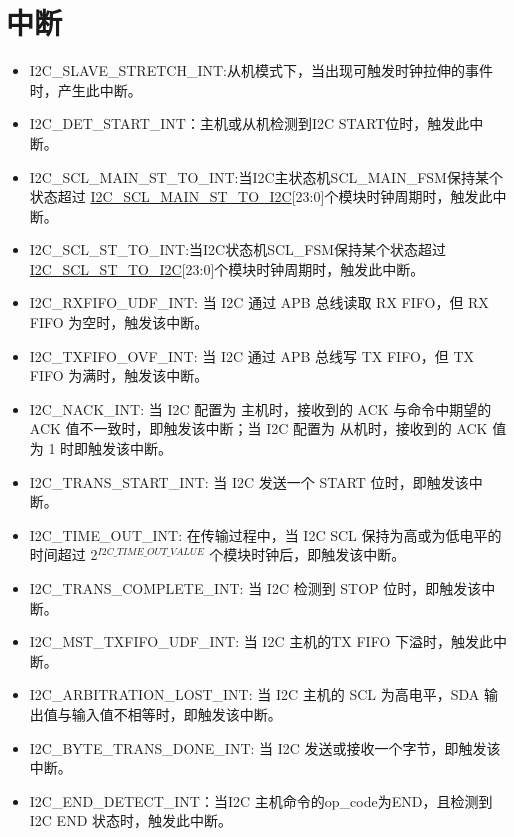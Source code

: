 \documentclass[main\_\_CN.tex]{subfiles}
\begin{document}
\section{中断}\label{sub:i2c-int}
\begin{itemize}
\item \label{int:i2c-slave-stretch}I2C\_SLAVE\_STRETCH\_INT:从机模式下，当出现可触发时钟拉伸的事件时，产生此中断。
\item \label{int:i2c-start}I2C\_DET\_START\_INT：主机或从机检测到I2C START位时，触发此中断。
\item \label{int:i2c-scl-main-fsm}I2C\_SCL\_MAIN\_ST\_TO\_INT:当I2C主状态机SCL\_MAIN\_FSM保持某个状态超过 \hyperref[fielddesc:I2CSCLMAINSTTOI2C]{I2C\_SCL\_MAIN\_ST\_TO\_I2C}[23:0]个模块时钟周期时，触发此中断。      
\item \label{int:i2c-scl-fsm}I2C\_SCL\_ST\_TO\_INT:当I2C状态机SCL\_FSM保持某个状态超过 \hyperref[fielddesc:I2CSCLSTTOI2C]{I2C\_SCL\_ST\_TO\_I2C}[23:0]个模块时钟周期时，触发此中断。
\item \label{int:i2c-rxfifo-udf}I2C\_RXFIFO\_UDF\_INT: 当 I2C 通过 APB 总线读取 RX FIFO，但 RX FIFO 为空时，触发该中断。
\item \label{int:i2c-txfifo-ovf}I2C\_TXFIFO\_OVF\_INT: 当 I2C 通过 APB 总线写 TX FIFO，但 TX FIFO 为满时，触发该中断。
\item \label{int:i2c-nack}I2C\_NACK\_INT: 当 I2C 配置为 主机时，接收到的 ACK 与命令中期望的 ACK 值不一致时，即触发该中断；当 I2C 配置为 从机时，接收到的 ACK 值为 1 时即触发该中断。
\item \label{int:i2c-trans-start}I2C\_TRANS\_START\_INT: 当 I2C 发送一个 START 位时，即触发该中断。
\item \label{int:i2c-time-out}I2C\_TIME\_OUT\_INT: 在传输过程中，当 I2C SCL 保持为高或为低电平的时间超过 2$^{\hyperref[fielddesc:I2CTIMEOUTVALUE]{I2C\_TIME\_OUT\_VALUE}}$ 个模块时钟后，即触发该中断。
\item \label{int:i2c-trans-complete}I2C\_TRANS\_COMPLETE\_INT: 当 I2C 检测到 STOP 位时，即触发该中断。
\item \label{int:i2c-mst-txfifo-udf}I2C\_MST\_TXFIFO\_UDF\_INT: 当 I2C 主机的TX FIFO 下溢时，触发此中断。
\item \label{int:i2c-arbitration-lost}I2C\_ARBITRATION\_LOST\_INT: 当 I2C 主机的 SCL 为高电平，SDA 输出值与输入值不相等时，即触发该中断。
\item \label{int:i2c-byte-trans-done}I2C\_BYTE\_TRANS\_DONE\_INT: 当 I2C 发送或接收一个字节，即触发该中断。
\item \label{int:i2c-end}I2C\_END\_DETECT\_INT：当I2C 主机命令的op\_code为END，且检测到 I2C END 状态时，触发此中断。

\end{itemize}
\end{document}

